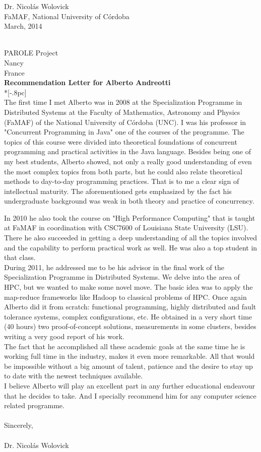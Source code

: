\documentclass[letter,12pt,english]{article}
\begin{document}
{
\raggedleft{}
Dr. Nicol\'as Wolovick \\
FaMAF, National University of C\'ordoba \\
March, 2014 \\
}

{ \hfill \\ 
PAROLE Project\\
Nancy\\
France\\

\large
\bf Recommendation Letter for Alberto Andreotti} \\*[-.8pc]
\\

The first time I met Alberto was in 2008 at the Specialization Programme in Distributed Systems at the Faculty of Mathematics, Astronomy and Physics (FaMAF) of the National University of Córdoba (UNC). I was his professor in "Concurrent Programming in Java" one of the courses of the programme.
The topics of this course were divided into theoretical foundations of concurrent programming and practical activities in the Java language. Besides being one of my best students, Alberto showed, not only a really good understanding of even the most complex topics from both parts, but he could also relate theoretical methods to day-to-day programming practices. That is to me a clear sign of intellectual maturity. The aforementioned gets emphasized by the fact his undergraduate background was weak in both theory and practice of concurrency.

In 2010 he also took the course on "High Performance Computing" that is taught at FaMAF in coordination with CSC7600 of Louisiana State University (LSU). There he also succeeded in getting a deep understanding of all the topics involved and the capability to perform practical work as well. He was also a top student in that class.
\\
During 2011, he addressed me to be his advisor in the final work of the Specialization Programme in Distributed Systems. We delve into the area of HPC, but we wanted to make some novel move. The basic idea was to apply the map-reduce frameworks like Hadoop to classical problems of HPC. Once again Alberto did it from scratch: functional programming, highly distributed and fault tolerance systems, complex configurations, etc. He obtained in a very short time (40 hours) two proof-of-concept solutions, measurements in some clusters, besides writing a very good report of his work.
\\
The fact that he accomplished all these academic goals at the same time he is working full time in the industry, makes it even more remarkable. All that would be impossible without a big amount of talent, patience and the desire to stay up to date with the newest techniques available.
\\
I believe Alberto will play an excellent part in any further educational endeavour that he decides to take. And I specially recommend him for any computer science related programme.
\\
\\
Sincerely, 
\\
\\
Dr. Nicol\'as Wolovick
\end{document}
